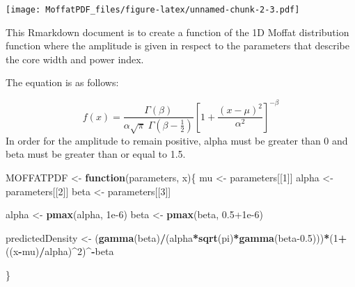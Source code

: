 \documentclass[
]{article}
\newenvironment{Shaded}{\begin{snugshade}}{\end{snugshade}}
\newcommand{\AttributeTok}[1]{\textcolor[rgb]{0.13,0.29,0.53}{#1}}
\newcommand{\ControlFlowTok}[1]{\textcolor[rgb]{0.13,0.29,0.53}{\textbf{#1}}}
\newcommand{\DecValTok}[1]{\textcolor[rgb]{0.00,0.00,0.81}{#1}}
\newcommand{\FloatTok}[1]{\textcolor[rgb]{0.00,0.00,0.81}{#1}}
\newcommand{\FunctionTok}[1]{\textcolor[rgb]{0.13,0.29,0.53}{\textbf{#1}}}
\newcommand{\NormalTok}[1]{#1}
\newcommand{\OtherTok}[1]{\textcolor[rgb]{0.56,0.35,0.01}{#1}}
\newcommand{\SpecialCharTok}[1]{\textcolor[rgb]{0.81,0.36,0.00}{\textbf{#1}}}
\begin{document}
\texttt{[image: MoffatPDF\_files/figure-latex/unnamed-chunk-2-3.pdf]}

\begin{Shaded}
\end{Shaded}

This Rmarkdown document is to create a function of the 1D Moffat
distribution function where the amplitude is given in respect to the
parameters that describe the core width and power index.

The equation is as follows:

\[f(x) = \frac{\Gamma(\beta)}{\alpha\sqrt\pi~\Gamma(\beta-\frac{1}{2})} \left[1+\frac{(x-\mu)^2}{\alpha^2}\right]^{-\beta}\]
In order for the amplitude to remain positive, alpha must be greater
than 0 and beta must be greater than or equal to 1.5.

\begin{Shaded}
\begin{Highlighting}[]
\NormalTok{MOFFATPDF }\OtherTok{\textless{}{-}} \ControlFlowTok{function}\NormalTok{(parameters, x)\{}
\NormalTok{  mu }\OtherTok{\textless{}{-}}\NormalTok{ parameters[[}\DecValTok{1}\NormalTok{]]}
\NormalTok{  alpha }\OtherTok{\textless{}{-}}\NormalTok{ parameters[[}\DecValTok{2}\NormalTok{]]}
\NormalTok{  beta }\OtherTok{\textless{}{-}}\NormalTok{ parameters[[}\DecValTok{3}\NormalTok{]]}
  
\NormalTok{  alpha }\OtherTok{\textless{}{-}} \FunctionTok{pmax}\NormalTok{(alpha, }\FloatTok{1e{-}6}\NormalTok{)}
\NormalTok{  beta }\OtherTok{\textless{}{-}} \FunctionTok{pmax}\NormalTok{(beta, }\FloatTok{0.5+1e{-}6}\NormalTok{)}
  
\NormalTok{  predictedDensity }\OtherTok{\textless{}{-}}\NormalTok{ (}\FunctionTok{gamma}\NormalTok{(beta)}\SpecialCharTok{/}\NormalTok{(alpha}\SpecialCharTok{*}\FunctionTok{sqrt}\NormalTok{(pi)}\SpecialCharTok{*}\FunctionTok{gamma}\NormalTok{(beta}\FloatTok{{-}0.5}\NormalTok{)))}\SpecialCharTok{*}\NormalTok{(}\DecValTok{1}\SpecialCharTok{+}\NormalTok{((x}\SpecialCharTok{{-}}\NormalTok{mu)}\SpecialCharTok{/}\NormalTok{alpha)}\SpecialCharTok{\^{}}\DecValTok{2}\NormalTok{)}\SpecialCharTok{\^{}{-}}\NormalTok{beta}
  
\NormalTok{\}}
\end{Highlighting}
\end{Shaded}
\end{document}
